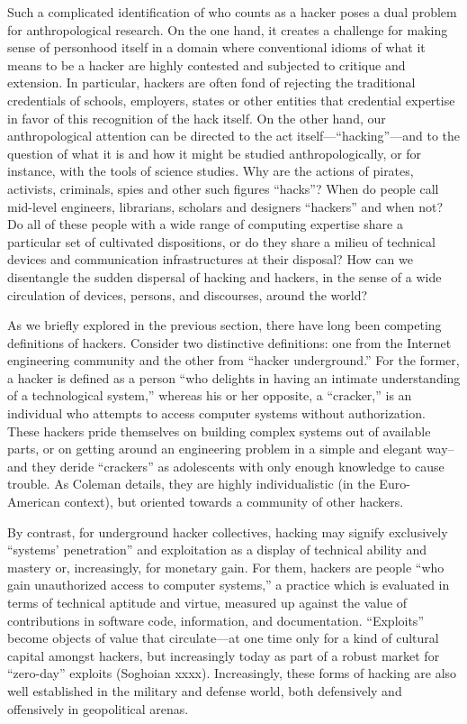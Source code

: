 \documentclass[10pt,letter,oneside]{scrartcl}
\begin{document}
Such a complicated identification of who counts as a hacker poses a dual
problem for anthropological research.  On the one hand, it creates a challenge
for making sense of personhood itself in a domain where conventional idioms of
what it means to be a hacker are highly contested and subjected to critique
and extension.  In particular, hackers are often fond of rejecting the traditional credentials of schools, employers, states or other entities that credential expertise 
in favor of this recognition of the hack itself. On the other hand, our 
anthropological attention can be directed to the act itself---``hacking''---and 
to the question of what it is and how it might be studied anthropologically, or 
for instance, with the tools of science studies. Why are the actions of pirates, 
activists, criminals, spies and other such figures ``hacks''?  When do people 
call mid-level engineers, librarians, scholars and designers ``hackers'' and 
when not?  Do all of these people with a wide range of computing expertise share 
a particular set of cultivated dispositions, or do they share a milieu of 
technical devices and communication infrastructures at their disposal?  How can we 
disentangle the sudden dispersal of hacking and hackers, in the sense of a wide circulation of devices, persons, and discourses, around the world?

As we briefly explored in the previous section, there have long been competing
definitions of hackers.  Consider two distinctive definitions: one from the
Internet engineering community and the other from ``hacker underground.''  For
the former, a hacker is defined as a person ``who delights in having an intimate
understanding of a technological system,'' whereas his or her opposite, a
``cracker,'' is an individual who attempts to access computer systems without
authorization.  These hackers pride themselves on building complex systems out
of available parts, or on getting around an engineering problem in a simple and
elegant way--and they deride ``crackers'' as adolescents with only enough
knowledge to cause trouble.  As Coleman \cite*{coleman_coding_2012} details,
they are highly individualistic (in the Euro-American context), but oriented
towards a community of other hackers.

By contrast, for underground hacker collectives, hacking may signify
exclusively ``systems' penetration'' and exploitation as a display of technical
ability and mastery or, increasingly, for monetary gain.  For them, hackers are
people ``who gain unauthorized access to computer systems,'' a practice which
is evaluated in terms of technical aptitude and virtue, measured up against the
value of contributions in software code, information, and documentation.
``Exploits'' become objects of value that circulate---at one time only for a
kind of cultural capital amongst hackers, but increasingly today as part of a
robust market for ``zero-day'' exploits (Soghoian xxxx).  Increasingly, these
forms of hacking are also well established in the military and defense world,
both defensively and offensively in geopolitical arenas.
\end{document}
